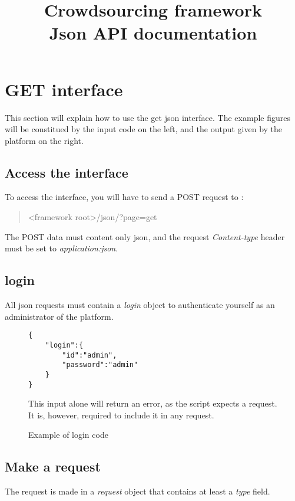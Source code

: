 \documentclass[notitlepage]{report}
\title{Crowdsourcing framework \\
Json API documentation}
\makeatletter
\newcommand*{\toccontents}{\@starttoc{toc}}
\makeatother
\begin{document}
\maketitle
\toccontents

\newpage

\chapter{GET interface}
This section will explain how to use the get json interface.
The example figures will be constitued by the input code on the left, and the output given by the platform on the right.

\section{Access the interface}
To access the interface, you will have to send a POST request to : 
\begin{quote}<framework root>/json/?page=get\end{quote}
The POST data must content only json, and the request \emph{Content-type} header must be set to \emph{application:json}.

\section{login}
All json requests must contain a \emph{login} object to authenticate yourself as an administrator of the platform.

\begin{figure}[h]
\centering
\begin{minipage}{.45\linewidth}
\begin{verbatim}
{
	"login":{	
		"id":"admin",
		"password":"admin"
	}
}
\end{verbatim}
\end{minipage}
\begin{minipage}{.45\linewidth}
This input alone will return an error, as the script expects a request. It is, however, required to include it in any request.
\end{minipage}
\caption{Example of login code}
\end{figure}

\newpage
\section{Make a request}
The request is made in a \emph{request} object that contains at least a \emph{type} field.
\end{document}
